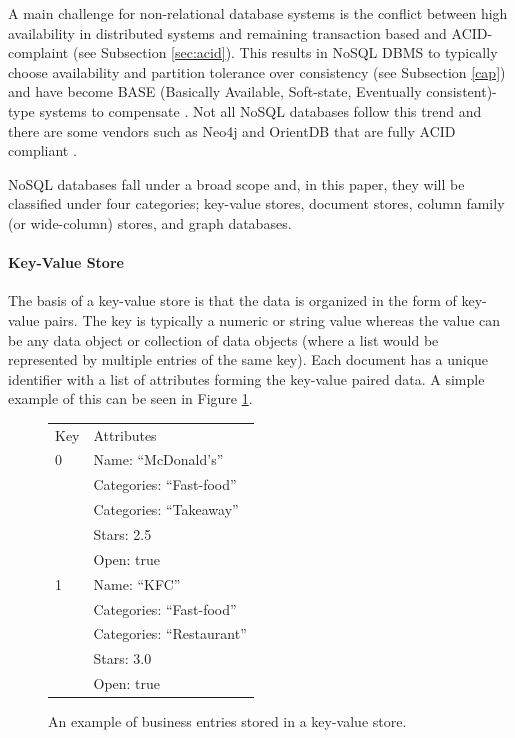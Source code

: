 A main challenge for non-relational database systems is the conflict between high availability in distributed systems and remaining transaction based and ACID-complaint (see Subsection \ref{sec:acid}). This results in NoSQL DBMS to typically choose availability and partition tolerance over consistency (see Subsection \ref{cap}) and have become BASE (Basically Available, Soft-state, Eventually consistent)-type systems to compensate \cite{base}. Not all NoSQL databases follow this trend and there are some vendors such as Neo4j and OrientDB that are fully ACID compliant \cite{acid}.

NoSQL databases fall under a broad scope and, in this paper, they will be classified under four categories; key-value stores, document stores, column family (or wide-column) stores, and graph databases.

\paragraph{Key-Value Store}

The basis of a key-value store is that the data is organized in the form of key-value pairs. The key is typically a numeric or string value whereas the value can be any data object or collection of data objects (where a list would be represented by multiple entries of the same key). Each document has a unique identifier with a list of attributes forming the key-value paired data. A simple example of this can be seen in Figure \ref{fig:keyvalue}.

\begin{figure}[ht]
    \small
    \centering
    \begin{tabular}{ |p{2cm}|p{4cm}|}
        \hline
        \rowcolor{Gray}
        \multicolumn{2}{|c|}{Businesses} \\
        \hline
        \rowcolor{LightGray}
        Key & Attributes                 \\
        \hline
        0   & Name: ``McDonald's''       \\
            & Categories: ``Fast-food''  \\
            & Categories: ``Takeaway''   \\
            & Stars: 2.5                 \\
            & Open: true                 \\
        \hline
        1   & Name: ``KFC''              \\
            & Categories: ``Fast-food''  \\
            & Categories: ``Restaurant'' \\
            & Stars: 3.0                 \\
            & Open: true                 \\
        \hline
    \end{tabular}
    \vspace*{5mm}
    \caption{An example of business entries stored in a key-value store.}
    \label{fig:keyvalue}
\end{figure}

